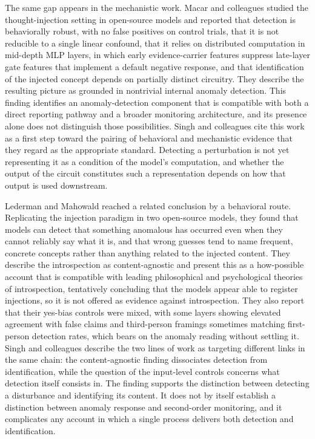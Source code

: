 \documentclass[11pt]{article}
\theoremstyle{definition}
\theoremstyle{remark}
\begin{document}
The same gap appears in the mechanistic work. Macar and colleagues \citeyearpar{macar2026} studied the thought-injection setting in open-source models and reported that detection is behaviorally robust, with no false positives on control trials, that it is not reducible to a single linear confound, that it relies on distributed computation in mid-depth MLP layers, in which early evidence-carrier features suppress late-layer gate features that implement a default negative response, and that identification of the injected concept depends on partially distinct circuitry. They describe the resulting picture as grounded in nontrivial internal anomaly detection. This finding identifies an anomaly-detection component that is compatible with both a direct reporting pathway and a broader monitoring architecture, and its presence alone does not distinguish those possibilities. Singh and colleagues cite this work as a first step toward the pairing of behavioral and mechanistic evidence that they regard as the appropriate standard. Detecting a perturbation is not yet representing it as a condition of the model's computation, and whether the output of the circuit constitutes such a representation depends on how that output is used downstream.

Lederman and Mahowald \citeyearpar{lederman2026} reached a related conclusion by a behavioral route. Replicating the injection paradigm in two open-source models, they found that models can detect that something anomalous has occurred even when they cannot reliably say what it is, and that wrong guesses tend to name frequent, concrete concepts rather than anything related to the injected content. They describe the introspection as content-agnostic and present this as a how-possible account that is compatible with leading philosophical and psychological theories of introspection, tentatively concluding that the models appear able to register injections, so it is not offered as evidence against introspection. They also report that their yes-bias controls were mixed, with some layers showing elevated agreement with false claims and third-person framings sometimes matching first-person detection rates, which bears on the anomaly reading without settling it. Singh and colleagues describe the two lines of work as targeting different links in the same chain: the content-agnostic finding dissociates detection from identification, while the question of the input-level controls concerns what detection itself consists in. The finding supports the distinction between detecting a disturbance and identifying its content. It does not by itself establish a distinction between anomaly response and second-order monitoring, and it complicates any account in which a single process delivers both detection and identification.
\end{document}

